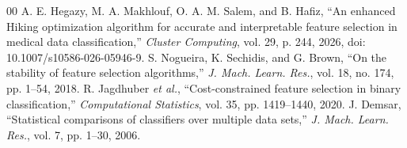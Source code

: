 \documentclass[10pt,journal,a4paper]{IEEEtran}
\begin{document}
\begin{thebibliography}{00}
 A. E. Hegazy, M. A. Makhlouf, O. A. M. Salem, and B. Hafiz, ``An enhanced Hiking optimization algorithm for accurate and interpretable feature selection in medical data classification,'' \emph{Cluster Computing}, vol. 29, p. 244, 2026, doi: 10.1007/s10586-026-05946-9.
 S. Nogueira, K. Sechidis, and G. Brown, ``On the stability of feature selection algorithms,'' \emph{J. Mach. Learn. Res.}, vol. 18, no. 174, pp. 1--54, 2018.
 R. Jagdhuber \emph{et al.}, ``Cost-constrained feature selection in binary classification,'' \emph{Computational Statistics}, vol. 35, pp. 1419--1440, 2020.
 J. Demsar, ``Statistical comparisons of classifiers over multiple data sets,'' \emph{J. Mach. Learn. Res.}, vol. 7, pp. 1--30, 2006.
\end{thebibliography}
\end{document}
